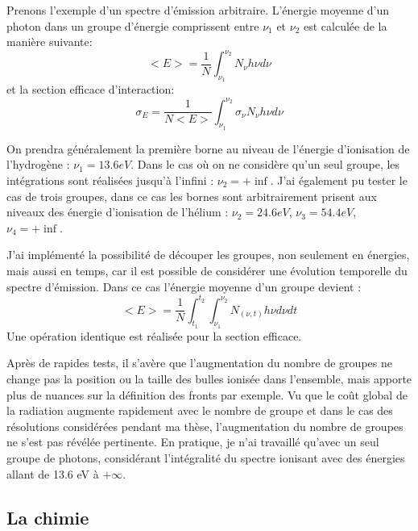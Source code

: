 Prenons l'exemple d'un spectre d'émission arbitraire.
L’énergie moyenne d'un photon dans un groupe d'énergie comprissent entre $\nu_1$ et $\nu_2$ est calculée de la manière suivante:
\begin{equation}
<E> = \frac{1}{N} \int_{\nu_1}^{\nu_2} N_\nu h \nu d\nu
\end{equation}
et la section efficace d'interaction:
\begin{equation}
\sigma_E = \frac{1}{N<E>} \int_{\nu_1}^{\nu_2} \sigma_\nu N_\nu h \nu d\nu
\end{equation}

On prendra généralement la première borne au niveau de l'énergie d'ionisation de l'hydrogène : $\nu_1=13.6eV$.
Dans le cas où on ne considère qu'un seul groupe, les intégrations sont réalisées jusqu'à l'infini : $\nu_2= + \inf$.
J'ai également pu tester le cas de trois groupes, dans ce cas les bornes sont arbitrairement prisent aux niveaux des énergie d'ionisation de l'hélium : 
$\nu_2= 24.6 eV$, $\nu_3= 54.4 eV $, $\nu_4= + \inf$.

J'ai implémenté la possibilité de découper les groupes, non seulement en énergies, mais aussi en temps, car il est possible de considérer une évolution temporelle du spectre d'émission.
Dans ce cas l'énergie moyenne d'un groupe devient : 
\begin{equation}
<E> = \frac{1}{N}  \int_{t_1}^{t_2}  \int_{\nu_1}^{\nu_2} N_{(\nu,t)} h \nu d\nu dt
\end{equation}
Une opération identique est réalisée pour la section efficace.

Après de rapides tests, il s'avère que l'augmentation du nombre de groupes ne change pas la position ou la taille des bulles ionisée dans l'ensemble, mais apporte plus de nuances sur la définition des fronts par exemple.
Vu que le coût global de la radiation augmente rapidement avec le nombre de groupe et dans le cas des résolutions considérées pendant ma thèse, l'augmentation du nombre de groupes ne s'est pas révélée pertinente.
En pratique, je n'ai travaillé qu'avec un seul groupe de photons, considérant l'intégralité du spectre ionisant avec des énergies allant de 13.6 eV à $+\infty$.

\subsection{La chimie}
\label{sec:chimie}

